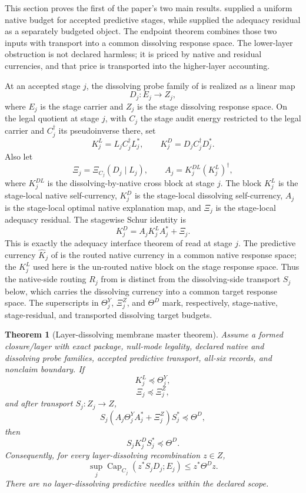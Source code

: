 \documentclass[11pt]{article}
\DeclareMathOperator{\Capacity}{Cap}
\newcommand{\XiRes}{\Xi}
\newcommand{\preceqq}{\preceq}
\newtheorem{theorem}{Theorem}[section]
\theoremstyle{definition}
\begin{document}
This section proves the first of the paper's two main results.
 supplied a uniform native budget for
accepted predictive stages, while  supplied the
adequacy residual as a separately budgeted object.  The endpoint theorem
combines those two inputs with transport into a common dissolving
response space.  The lower-layer obstruction is not declared harmless;
it is priced by native and residual currencies, and that price is
transported into the higher-layer accounting.

At an accepted stage \(j\), the dissolving probe family of
 is realized as a linear map
\[
  D_j:E_j\to Z_j,
\]
where \(E_j\) is the stage carrier and \(Z_j\) is the stage dissolving
response space.  On the legal quotient at stage \(j\), with \(C_j\) the
stage audit energy restricted to the legal carrier and \(C_j^\dagger\)
its pseudoinverse there, set
\[
  K^L_j=L_jC_j^\dagger L_j^*,\qquad
  K^D_j=D_jC_j^\dagger D_j^*.
\]
Also let
\[
  \Xi_j=\XiRes_{C_j}(D_j\mid L_j),\qquad
  A_j=K^{DL}_j(K^L_j)^\dagger,
\]
where \(K^{DL}_j\) is the dissolving-by-native cross block at stage
\(j\).  The block \(K^L_j\) is the stage-local native self-currency,
\(K^D_j\) is the stage-local dissolving self-currency, \(A_j\) is the
stage-local optimal native explanation map, and \(\Xi_j\) is the
stage-local adequacy residual.  The stagewise Schur identity is
\[
  K^D_j=A_jK^L_jA_j^*+\Xi_j.
\]
This is exactly the adequacy interface theorem of
 read at stage \(j\).  The predictive currency
\(\widehat K_j\) of  is the routed native
currency in a common native response space; the \(K^L_j\) used here is
the un-routed native block on the stage response space.  Thus the
native-side routing \(R_j\) from  is
distinct from the dissolving-side transport \(S_j\) below, which carries
the dissolving currency into a common target response space.
The superscripts in \(\Theta^Y_j\), \(\Xi^Z_j\), and \(\Theta^D\)
mark, respectively, stage-native, stage-residual, and transported
dissolving target budgets.

\begin{theorem}[Layer-dissolving membrane master theorem]\label{thm:main:layer-dissolving-master}
Assume a formed closure/layer with exact package, null-mode legality,
declared native and dissolving probe families, accepted predictive
transport, all-six records, and nonclaim boundary.  If
\[
  K^L_j\preceqq\Theta^Y_j,
\]
\[
  \Xi_j\preceqq\Xi^Z_j,
\]
and after transport \(S_j:Z_j\to Z\),
\[
  S_j(A_j\Theta^Y_jA_j^*+\Xi^Z_j)S_j^*\preceqq\Theta^D,
\]
then
\[
  S_jK^D_jS_j^*\preceqq\Theta^D.
\]
Consequently, for every layer-dissolving recombination \(z\in Z\),
\[
  \sup_j \Capacity_{C_j}(z^*S_jD_j;E_j)\le z^*\Theta^Dz.
\]
There are no layer-dissolving predictive needles within the declared scope.
\end{theorem}
\end{document}
